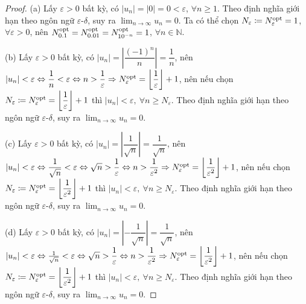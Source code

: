 \documentclass[oneside]{book}
\begin{document}
\begin{proof}
	(a) Lấy $\varepsilon > 0$ bất kỳ, có $|u_n| = |0| = 0 < \varepsilon$, $\forall n\ge1$. Theo định nghĩa giới hạn theo ngôn ngữ $\varepsilon$-$\delta$, suy ra $\lim_{n\to\infty} u_n = 0$. Ta có thể chọn $N_\varepsilon\coloneqq N_\varepsilon^{\rm opt} = 1$, $\forall\varepsilon > 0$, nên $N_{0.1}^{\rm opt} = N_{0.01}^{\rm opt} = N_{10^{-n}}^{\rm opt} = 1$, $\forall n\in\mathbb{N}$.
	
	\item(b) Lấy $\varepsilon > 0$ bất kỳ, có $|u_n| = \left|\dfrac{(-1)^n}{n}\right| = \dfrac{1}{n}$, nên $|u_n| < \varepsilon\Leftrightarrow\dfrac{1}{n} < \varepsilon\Leftrightarrow n > \dfrac{1}{\varepsilon}\Rightarrow N_\varepsilon^{\rm opt} = \left\lfloor\dfrac{1}{\varepsilon}\right\rfloor + 1$, nên nếu chọn $N_\varepsilon\coloneqq N_\varepsilon^{\rm opt} = \left\lfloor\dfrac{1}{\varepsilon}\right\rfloor + 1$ thì $|u_n| < \varepsilon,\ \forall n\ge N_\varepsilon$. Theo định nghĩa giới hạn theo ngôn ngữ $\varepsilon$-$\delta$, suy ra $\lim_{n\to\infty} u_n = 0$.
	
	\item(c) Lấy $\varepsilon > 0$ bất kỳ, có $|u_n| = \left|\dfrac{1}{\sqrt{n}}\right| = \dfrac{1}{\sqrt{n}}$, nên $|u_n| < \varepsilon\Leftrightarrow\dfrac{1}{\sqrt{n}} < \varepsilon\Leftrightarrow\sqrt{n} > \dfrac{1}{\varepsilon}\Leftrightarrow n > \dfrac{1}{\varepsilon^2}\Rightarrow N_\varepsilon^{\rm opt} = \left\lfloor\dfrac{1}{\varepsilon^2}\right\rfloor + 1$, nên nếu chọn $N_\varepsilon\coloneqq N_\varepsilon^{\rm opt} = \left\lfloor\dfrac{1}{\varepsilon^2}\right\rfloor + 1$ thì $|u_n| < \varepsilon,\ \forall n\ge N_\varepsilon$. Theo định nghĩa giới hạn theo ngôn ngữ $\varepsilon$-$\delta$, suy ra $\lim_{n\to\infty} u_n = 0$.
	
	\item(d) Lấy $\varepsilon > 0$ bất kỳ, có $|u_n| = \left|-\dfrac{1}{\sqrt{n}}\right| = \dfrac{1}{\sqrt{n}}$, nên $|u_n| < \varepsilon\Leftrightarrow\frac{1}{\sqrt{n}} < \varepsilon\Leftrightarrow\sqrt{n} > \dfrac{1}{\varepsilon}\Leftrightarrow n > \dfrac{1}{\varepsilon^2}\Rightarrow N_\varepsilon^{\rm opt} = \left\lfloor\dfrac{1}{\varepsilon^2}\right\rfloor + 1$, nên nếu chọn $N_\varepsilon\coloneqq N_\varepsilon^{\rm opt} = \left\lfloor\dfrac{1}{\varepsilon^2}\right\rfloor + 1$ thì $|u_n| < \varepsilon,\ \forall n\ge N_\varepsilon$. Theo định nghĩa giới hạn theo ngôn ngữ $\varepsilon$-$\delta$, suy ra $\lim_{n\to\infty} u_n = 0$.
	

\end{proof}
\end{document}
